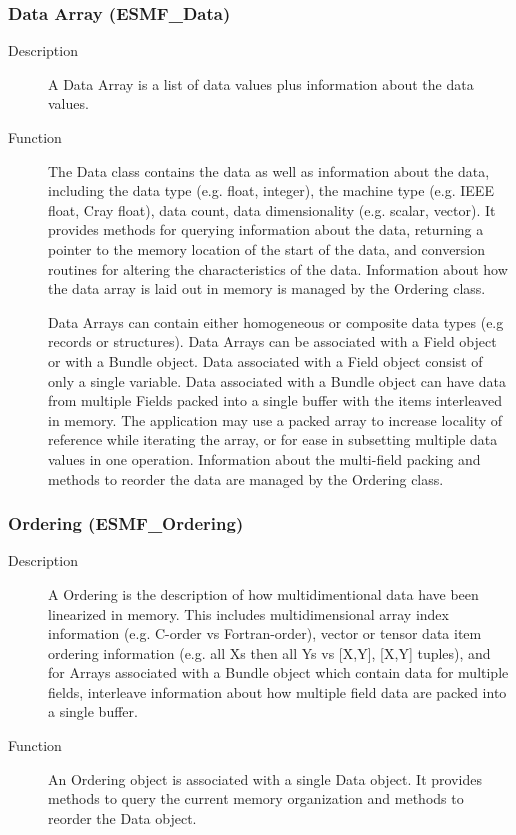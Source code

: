\subsubsection{Data Array (ESMF\_Data)}
\label{sec:dataarray} 
\begin{description}
\item [Description] A Data Array is a list of data values plus information about
the data values.
\item [Function] The Data class contains the data as well as information 
about the data, including the data type (e.g. float,
integer), the machine type (e.g. IEEE float, Cray float), 
data count, data dimensionality (e.g. scalar, vector).  
It provides methods for querying information about the data,
returning a pointer to the memory location of the start of the data, 
and conversion routines for altering the characteristics of the data.  
Information about how the data array is laid
out in memory is managed by the Ordering class.

Data Arrays can contain either homogeneous or composite data types 
(e.g records or structures).
Data Arrays can be associated with a Field object or with a Bundle object.
Data associated with a Field object consist of only a single variable.  
Data associated
with a Bundle object can have data from multiple Fields packed into a single
buffer with the items interleaved in memory.  
The application may use a packed array to increase
locality of reference while iterating the array, 
or for ease in subsetting multiple data values in one operation.
Information about the multi-field packing and methods to reorder the
data are managed by the Ordering class.

\end{description}

\subsubsection{Ordering (ESMF\_Ordering)}
\label{sec:ordering} 
\begin{description}
\item [Description] A Ordering is the description of how multidimentional data have been
linearized in memory.  This includes multidimensional array index information (e.g. C-order
vs Fortran-order), vector or tensor data item ordering information (e.g. all Xs then all
Ys vs [X,Y], [X,Y] tuples), and for Arrays associated with a Bundle object which contain
data for multiple fields, interleave information about how multiple field data are 
packed into a single buffer.
\item [Function] An Ordering object is associated with a single Data object.  It provides
methods to query the current memory organization and methods to reorder the Data object.
\end{description}

